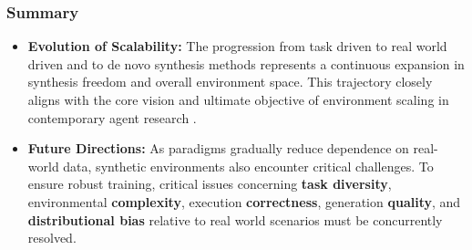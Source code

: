 \subsubsection{Summary}




\begin{tcolorbox}[takeaway,title={Takeaway 5.1}]
\begin{itemize}
    \item \textbf{Evolution of Scalability:} The progression from task driven to real world driven and to de novo synthesis methods represents a continuous expansion in synthesis freedom and overall environment space. This trajectory closely aligns with the core vision and ultimate objective of environment scaling in contemporary agent research \cite{silver2025welcome}.
    
    \item \textbf{Future Directions:} As paradigms gradually reduce dependence on real-world data, synthetic environments also encounter critical challenges. To ensure robust training, critical issues concerning \textbf{task diversity}, environmental \textbf{complexity}, execution \textbf{correctness}, generation \textbf{quality}, and \textbf{distributional bias} relative to real world scenarios must be concurrently resolved.
\end{itemize}
\end{tcolorbox}

